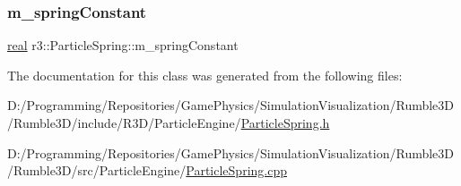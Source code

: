 \subsubsection{\texorpdfstring{m\+\_\+spring\+Constant}{m\_springConstant}}
{\footnotesize\ttfamily \mbox{\hyperlink{namespacer3_ab2016b3e3f743fb735afce242f0dc1eb}{real}} r3\+::\+Particle\+Spring\+::m\+\_\+spring\+Constant\hspace{0.3cm}{\ttfamily [protected]}}



The documentation for this class was generated from the following files\+:\begin{DoxyCompactItemize}
\item 
D\+:/\+Programming/\+Repositories/\+Game\+Physics/\+Simulation\+Visualization/\+Rumble3\+D/\+Rumble3\+D/include/\+R3\+D/\+Particle\+Engine/\mbox{\hyperlink{_particle_spring_8h}{Particle\+Spring.\+h}}\item 
D\+:/\+Programming/\+Repositories/\+Game\+Physics/\+Simulation\+Visualization/\+Rumble3\+D/\+Rumble3\+D/src/\+Particle\+Engine/\mbox{\hyperlink{_particle_spring_8cpp}{Particle\+Spring.\+cpp}}\end{DoxyCompactItemize}
